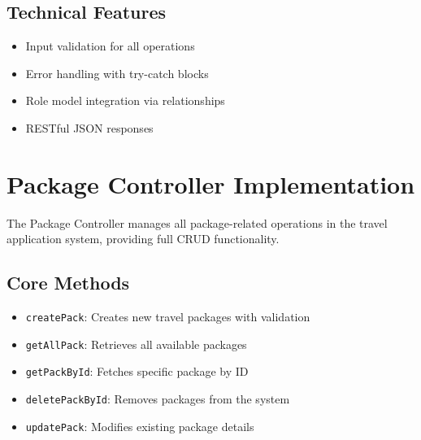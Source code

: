\subsection{Technical Features}
\begin{itemize}
    \item Input validation for all operations
    \item Error handling with try-catch blocks
    \item Role model integration via relationships
    \item RESTful JSON responses
\end{itemize}

\section{Package Controller Implementation}

The Package Controller manages all package-related operations in the travel application system, providing full CRUD functionality.

\subsection{Core Methods}
\begin{itemize}
    \item \texttt{createPack}: Creates new travel packages with validation
    \item \texttt{getAllPack}: Retrieves all available packages
    \item \texttt{getPackById}: Fetches specific package by ID
    \item \texttt{deletePackById}: Removes packages from the system
    \item \texttt{updatePack}: Modifies existing package details
\end{itemize}

